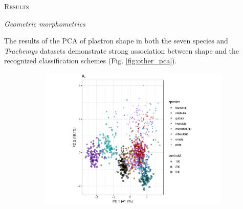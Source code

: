 \documentclass[12pt,letterpaper]{article}
\renewcommand{\section}[1]{%
\bigskip
\begin{center}
\begin{Large}
\normalfont\scshape #1
\medskip
\end{Large}
\end{center}}
\renewcommand{\subsection}[1]{%
\bigskip
\begin{center}
\begin{large}
\normalfont\itshape #1
\end{large}
\end{center}}
\begin{document}
\section{Results}

\subsection{Geometric morphometrics}

The results of the PCA of plastron shape in both the seven species and \textit{Trachemys} datasets demonstrate strong association between shape and the recognized classification schemes (Fig. \ref{fig:other_pca}).

\begin{figure}[ht]
  \centering
  \begin{subfigure}[b]{0.7\textwidth}
    \caption{}
    \includegraphics[width = \textwidth]{figure/cc7_pc_graph}
  \end{subfigure}


\end{figure}
\end{document}
